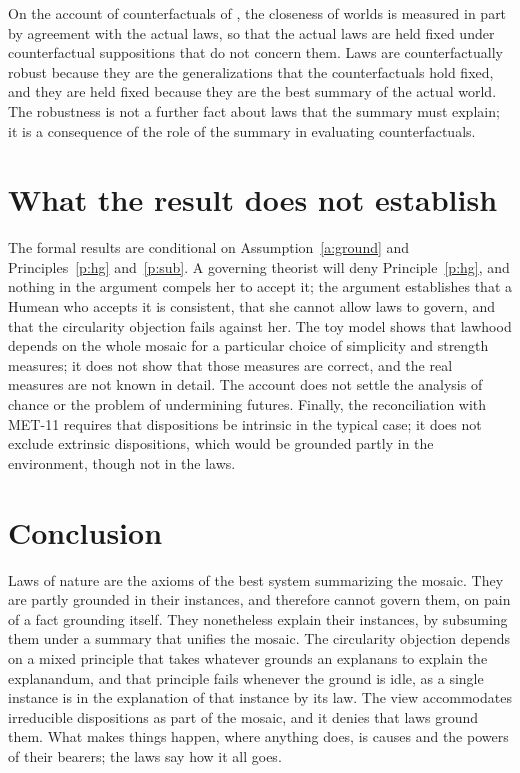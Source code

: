 \documentclass{situationist-preprint}
\begin{document}
\begin{reply}
On the account of counterfactuals of \citet{Lewis1979}, the closeness of worlds is measured in part by agreement with the actual laws, so that the actual laws are held fixed under counterfactual suppositions that do not concern them. Laws are counterfactually robust because they are the generalizations that the counterfactuals hold fixed, and they are held fixed because they are the best summary of the actual world. The robustness is not a further fact about laws that the summary must explain; it is a consequence of the role of the summary in evaluating counterfactuals.
\end{reply}

\section{What the result does not establish}\label{s:limits}

The formal results are conditional on Assumption~\ref{a:ground} and Principles~\ref{p:hg} and~\ref{p:sub}. A governing theorist will deny Principle~\ref{p:hg}, and nothing in the argument compels her to accept it; the argument establishes that a Humean who accepts it is consistent, that she cannot allow laws to govern, and that the circularity objection fails against her. The toy model shows that lawhood depends on the whole mosaic for a particular choice of simplicity and strength measures; it does not show that those measures are correct, and the real measures are not known in detail. The account does not settle the analysis of chance or the problem of undermining futures. Finally, the reconciliation with MET-11 requires that dispositions be intrinsic in the typical case; it does not exclude extrinsic dispositions, which would be grounded partly in the environment, though not in the laws.

\section{Conclusion}

Laws of nature are the axioms of the best system summarizing the mosaic. They are partly grounded in their instances, and therefore cannot govern them, on pain of a fact grounding itself. They nonetheless explain their instances, by subsuming them under a summary that unifies the mosaic. The circularity objection depends on a mixed principle that takes whatever grounds an explanans to explain the explanandum, and that principle fails whenever the ground is idle, as a single instance is in the explanation of that instance by its law. The view accommodates irreducible dispositions as part of the mosaic, and it denies that laws ground them. What makes things happen, where anything does, is causes and the powers of their bearers; the laws say how it all goes.
\end{document}
